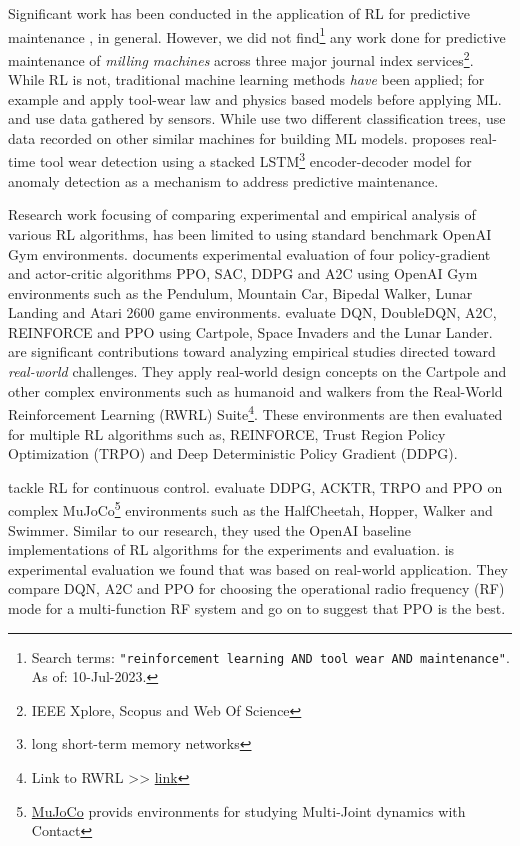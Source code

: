 \documentclass[a4paper, 12pt]{article}
\begin{document}
Significant work has been conducted in the application of RL for predictive maintenance \citep{Panzer2021, Erhan2021, siraskar2023}, in general. However, we did not find\footnote{Search terms: \texttt{"reinforcement learning AND tool wear AND maintenance"}. As of: 10-Jul-2023.} any work done for predictive maintenance of \textit{milling machines} across three major journal index services\footnote{IEEE Xplore\texttrademark{}, Scopus\texttrademark{} and Web Of Science\texttrademark{}}. %
While RL is not, traditional machine learning methods \textit{have} been applied; for example \cite{Qin2023} and \cite{Qiang2023} apply tool-wear law and physics based models before applying ML. \cite{Twardowski2023} and \cite{Denkena2023} use data gathered by sensors. While \cite{Twardowski2023} use two different classification trees, \cite{Denkena2023} use data recorded on other similar machines for building ML models. \cite{oshida2023development} proposes real-time tool wear detection using a stacked LSTM\footnote{long short-term memory networks} encoder-decoder model for anomaly detection as a mechanism to address predictive maintenance.  

Research work focusing of comparing experimental and empirical analysis of various RL algorithms, has been limited to using standard benchmark OpenAI Gym environments. \cite{sandeep2022experimental} documents experimental evaluation of four policy-gradient and actor-critic algorithms PPO, SAC, DDPG and A2C using OpenAI Gym environments such as the Pendulum, Mountain Car, Bipedal Walker, Lunar Landing and Atari 2600 game environments. \cite{Krishna2020} evaluate DQN, DoubleDQN, A2C, REINFORCE and PPO using Cartpole, Space Invaders and the Lunar Lander. \cite{dulac2021, dulac2020empirical} are significant contributions toward analyzing empirical studies directed toward \textit{real-world} challenges. They apply real-world design concepts on the Cartpole and other complex environments such as humanoid and walkers from the Real-World Reinforcement Learning (RWRL) Suite\footnote{Link to RWRL >>   \href{https://github.com/google-research/realworldrl_suite}{link}}. These environments are then evaluated for multiple RL algorithms such as, REINFORCE, Trust Region Policy Optimization (TRPO) and Deep Deterministic Policy Gradient (DDPG). 

\cite{dulac2021, henderson2018deep} tackle RL for continuous control. \cite{henderson2018deep} evaluate DDPG, ACKTR, TRPO and PPO on complex MuJoCo\footnote{\href{https://mujoco.org/}{MuJoCo} provids environments for studying Multi-Joint dynamics with Contact} environments such as the HalfCheetah, Hopper, Walker and Swimmer. Similar to our research, they used the OpenAI baseline implementations of RL algorithms for the experiments and evaluation. \cite{ford2022cognitive} is experimental evaluation we found that was based on real-world application. They compare DQN, A2C and PPO for choosing the operational radio frequency (RF) mode for a multi-function RF system and go on to suggest that PPO is the best.
\end{document}
